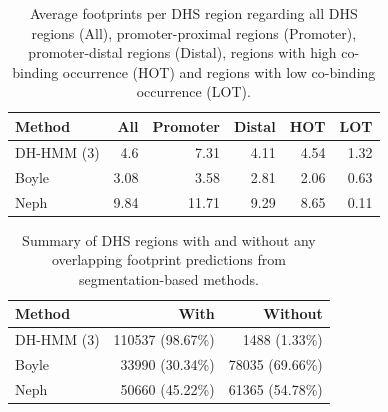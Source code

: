 \documentclass{bioinfo}
\begin{document}
\begin{table}[t]
\begin{center}
\caption{{\color{black} Average footprints per DHS region regarding all DHS regions (All), promoter-proximal regions (Promoter), promoter-distal regions (Distal), regions with high co-binding occurrence (HOT) and regions with low co-binding occurrence (LOT).}}
\label{tab:avgfoot}
\renewcommand{\arraystretch}{1.2}
  \begin{tabular}{ lrrrrr }
    \hline
    \textbf{Method} & \textbf{All} & \textbf{Promoter} & \textbf{Distal} & \textbf{HOT} & \textbf{LOT} \\
    \hline
    DH-HMM (3) & 4.6 & 7.31 & 4.11 & 4.54 & 1.32 \\
    \hline
    Boyle & 3.08 & 3.58 & 2.81 & 2.06 & 0.63 \\
    \hline
    Neph & 9.84 & 11.71 & 9.29 & 8.65 & 0.11 \\
    \hline
  \end{tabular}
\end{center}
\end{table}

\begin{table}[t]
\begin{center}
\caption{{\color{black} Summary of DHS regions with and without any overlapping footprint predictions from segmentation-based methods.}}
\label{tab:dhsfoot}
\renewcommand{\arraystretch}{1.2}
  \begin{tabular}{ lrr }
    \hline
    \textbf{Method} & \textbf{With}    & \textbf{Without} \\
    \hline
    DH-HMM (3)      & 110537 (98.67\%) & 1488 (1.33\%)    \\
    \hline
    Boyle           & 33990 (30.34\%)  & 78035 (69.66\%)  \\
    \hline
    Neph            & 50660 (45.22\%)  & 61365 (54.78\%)  \\
    \hline
  \end{tabular}
\end{center}
\end{table}
\end{document}
